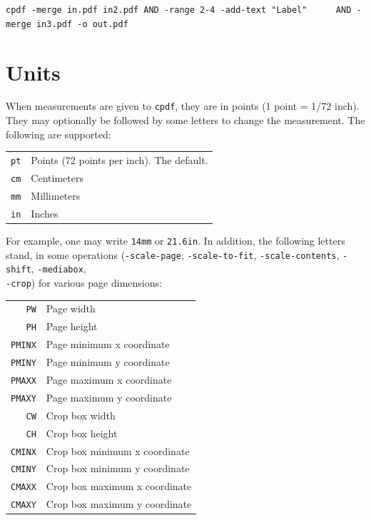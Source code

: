 \documentclass{book}
\newcommand{\cpdf}{\texttt{cpdf}}
\begin{document}
\begin{framed}
  \noindent\small\verb!cpdf -merge in.pdf in2.pdf AND -range 2-4 -add-text "Label"!
  \noindent\small\verb!     AND -merge in3.pdf -o out.pdf!
\end{framed}

\section{Units}
When measurements are given to \cpdf, they are in points (1 point = 1/72 inch). They may optionally
be followed by some letters to change the measurement. The following are
supported:

\begin{center}
\begin{tabular}{rl}
  \texttt{pt} & Points (72 points per inch). The default. \\
  \texttt{cm} & Centimeters \\
  \texttt{mm} & Millimeters \\
  \texttt{in} & Inches \\
\end{tabular}
\end{center}

\noindent For example, one may write \texttt{14mm} or \texttt{21.6in}. In addition, the following letters stand, in some operations (\texttt{-scale-page}, \texttt{-scale-to-fit}, \texttt{-scale-contents}, \texttt{-shift}, \texttt{-mediabox},\\ \texttt{-crop}) for various page dimensions:

\begin{center}
\begin{tabular}{rl}
  \texttt{PW} & Page width\\
  \texttt{PH} & Page height\\
  \texttt{PMINX} & Page minimum x coordinate\\
  \texttt{PMINY} & Page minimum y coordinate\\
  \texttt{PMAXX} & Page maximum x coordinate\\
  \texttt{PMAXY} & Page maximum y coordinate\\
  \texttt{CW} & Crop box width\\
  \texttt{CH} & Crop box height\\
  \texttt{CMINX} & Crop box minimum x coordinate\\
  \texttt{CMINY} & Crop box minimum y coordinate\\
  \texttt{CMAXX} & Crop box maximum x coordinate\\
  \texttt{CMAXY} & Crop box maximum y coordinate
\end{tabular}
\end{center}
\end{document}
